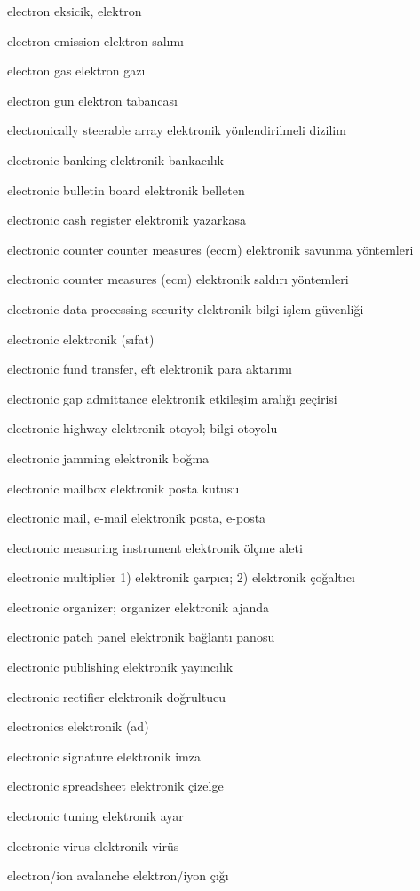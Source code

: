 \documentclass[12pt,fleqn]{article}\usepackage{../../common}
\begin{document}
electron eksicik, elektron

electron emission elektron salımı

electron gas elektron gazı

electron gun elektron tabancası

electronically steerable array elektronik yönlendirilmeli dizilim

electronic banking elektronik bankacılık

electronic bulletin board elektronik belleten

electronic cash register elektronik yazarkasa

electronic counter counter measures (eccm) elektronik savunma yöntemleri

electronic counter measures (ecm) elektronik saldırı yöntemleri

electronic data processing security elektronik bilgi işlem güvenliği

electronic elektronik (sıfat)

electronic fund transfer, eft elektronik para aktarımı

electronic gap admittance elektronik etkileşim aralığı geçirisi

electronic highway elektronik otoyol; bilgi otoyolu

electronic jamming elektronik boğma

electronic mailbox elektronik posta kutusu

electronic mail, e-mail elektronik posta, e-posta

electronic measuring instrument elektronik ölçme aleti

electronic multiplier 1) elektronik çarpıcı; 2) elektronik çoğaltıcı

electronic organizer; organizer elektronik ajanda

electronic patch panel elektronik bağlantı panosu

electronic publishing elektronik yayıncılık

electronic rectifier elektronik doğrultucu

electronics elektronik (ad)

electronic signature elektronik imza

electronic spreadsheet elektronik çizelge

electronic tuning elektronik ayar

electronic virus elektronik virüs

electron/ion avalanche elektron/iyon çığı
\end{document}
